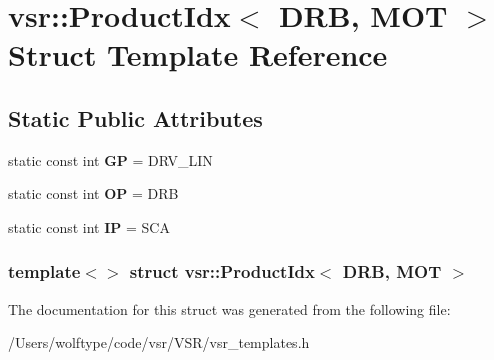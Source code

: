 \hypertarget{structvsr_1_1_product_idx_3_01_d_r_b_00_01_m_o_t_01_4}{\section{vsr\-:\-:Product\-Idx$<$ D\-R\-B, M\-O\-T $>$ Struct Template Reference}
\label{structvsr_1_1_product_idx_3_01_d_r_b_00_01_m_o_t_01_4}
}
\subsection*{Static Public Attributes}
\begin{DoxyCompactItemize}
\item 
\hypertarget{structvsr_1_1_product_idx_3_01_d_r_b_00_01_m_o_t_01_4_ae2ed436d62bda524befdec906426df91}{static const int {\bfseries G\-P} = D\-R\-V\-\_\-\-L\-I\-N}\label{structvsr_1_1_product_idx_3_01_d_r_b_00_01_m_o_t_01_4_ae2ed436d62bda524befdec906426df91}

\item 
\hypertarget{structvsr_1_1_product_idx_3_01_d_r_b_00_01_m_o_t_01_4_a4470a598f67ce98647482b662d426954}{static const int {\bfseries O\-P} = D\-R\-B}\label{structvsr_1_1_product_idx_3_01_d_r_b_00_01_m_o_t_01_4_a4470a598f67ce98647482b662d426954}

\item 
\hypertarget{structvsr_1_1_product_idx_3_01_d_r_b_00_01_m_o_t_01_4_a86b7061da6241b12bac759b37c8e26a7}{static const int {\bfseries I\-P} = S\-C\-A}\label{structvsr_1_1_product_idx_3_01_d_r_b_00_01_m_o_t_01_4_a86b7061da6241b12bac759b37c8e26a7}

\end{DoxyCompactItemize}
\subsubsection*{template$<$$>$ struct vsr\-::\-Product\-Idx$<$ D\-R\-B, M\-O\-T $>$}



The documentation for this struct was generated from the following file\-:\begin{DoxyCompactItemize}
\item 
/\-Users/wolftype/code/vsr/\-V\-S\-R/vsr\-\_\-templates.\-h\end{DoxyCompactItemize}
